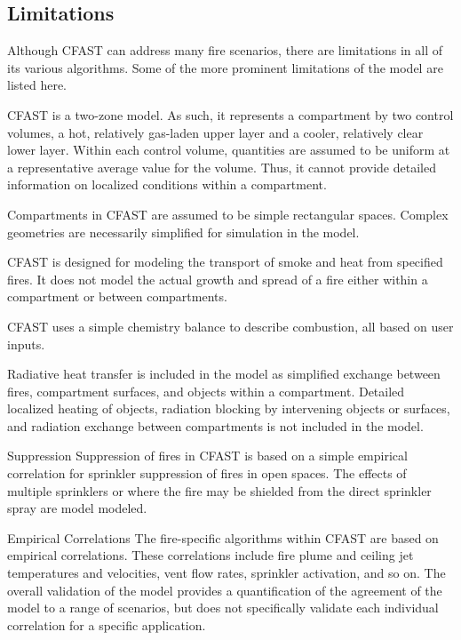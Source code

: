 \documentclass[11pt]{book}
\begin{document}
\subsection{Limitations}
Although CFAST can address many fire scenarios, there are limitations in all of its various algorithms. Some of the more prominent limitations of the model are listed here.
\begin{description}
\item[Zone Model Assumption] CFAST is a two-zone model.  As such, it represents a compartment by two control volumes, a hot, relatively gas-laden upper layer and a cooler, relatively clear lower layer.  Within each control volume, quantities are assumed to be uniform at a representative average value for the volume. Thus, it cannot provide detailed information on localized conditions within a compartment.
\item[Rectilinear Geometry] Compartments in CFAST are assumed to be simple rectangular spaces. Complex geometries are necessarily simplified for simulation in the model.
\item[Fire Growth and Spread] CFAST is designed for modeling the transport of smoke and heat from specified fires. It does not model the actual growth and spread of a fire either within a compartment or between compartments.
\item[Combustion] CFAST uses a simple chemistry balance to describe combustion, all based on user inputs.
\item[Radiation] Radiative heat transfer is included in the model as simplified exchange between fires, compartment surfaces, and objects within a compartment. Detailed localized heating of objects, radiation blocking by intervening objects or surfaces, and radiation exchange between compartments is not included in the model.
\item{Suppression} Suppression of fires in CFAST is based on a simple empirical correlation for sprinkler suppression of fires in open spaces.  The effects of multiple sprinklers or where the fire may be shielded from the direct sprinkler spray are model modeled.
\item{Empirical Correlations} The fire-specific algorithms within CFAST are based on empirical correlations. These correlations include fire plume and ceiling jet temperatures and velocities, vent flow rates, sprinkler activation, and so on. The overall validation of the model provides a quantification of the agreement of the model to a range of scenarios, but does not specifically validate each individual correlation for a specific application.
\end{description}
\end{document}
